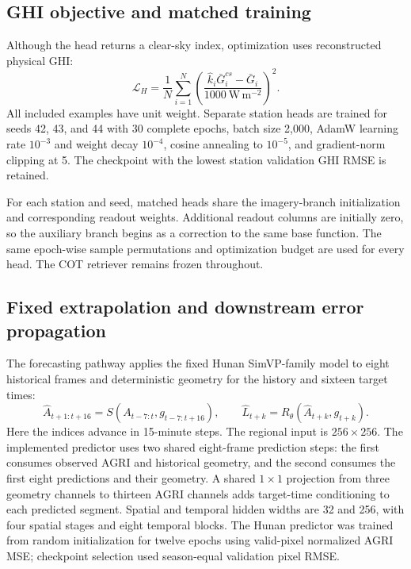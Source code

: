 \documentclass[11pt]{article}
\begin{document}
\subsection{GHI objective and matched training}
Although the head returns a clear-sky index, optimization uses reconstructed physical GHI:
\begin{equation}
\mathcal L_H=\frac{1}{N}\sum_{i=1}^{N}
\left(\frac{\widehat k_i\bar G^{cs}_i-\bar G_i}
{1000\ \mathrm{W\,m^{-2}}}\right)^2 .
\label{eq:ghi-loss}
\end{equation}
All included examples have unit weight. Separate station heads are trained for seeds 42, 43, and 44 with 30 complete epochs, batch size 2,000, AdamW learning rate $10^{-3}$ and weight decay $10^{-4}$, cosine annealing to $10^{-5}$, and gradient-norm clipping at 5. The checkpoint with the lowest station validation GHI RMSE is retained.

For each station and seed, matched heads share the imagery-branch initialization and corresponding readout weights. Additional readout columns are initially zero, so the auxiliary branch begins as a correction to the same base function. The same epoch-wise sample permutations and optimization budget are used for every head. The COT retriever remains frozen throughout.

\subsection{Fixed extrapolation and downstream error propagation}
The forecasting pathway applies the fixed Hunan SimVP-family model to eight historical frames and deterministic geometry for the history and sixteen target times:
\begin{equation}
\widehat A_{t+1:t+16}=S(A_{t-7:t},g_{t-7:t+16}),
\qquad
\widehat L_{t+k}=R_\theta(\widehat A_{t+k},g_{t+k}).
\label{eq:forecast}
\end{equation}
Here the indices advance in 15-minute steps. The regional input is $256\times256$. The implemented predictor uses two shared eight-frame prediction steps: the first consumes observed AGRI and historical geometry, and the second consumes the first eight predictions and their geometry. A shared $1\times1$ projection from three geometry channels to thirteen AGRI channels adds target-time conditioning to each predicted segment. Spatial and temporal hidden widths are 32 and 256, with four spatial stages and eight temporal blocks. The Hunan predictor was trained from random initialization for twelve epochs using valid-pixel normalized AGRI MSE; checkpoint selection used season-equal validation pixel RMSE.
\end{document}
